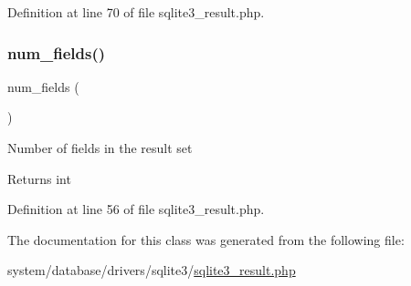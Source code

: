 Definition at line 70 of file sqlite3\+\_\+result.\+php.

\mbox{\label{class_c_i___d_b__sqlite3__result_af831bf363e4d7d661a717a4932af449d}} 
\subsubsection{\texorpdfstring{num\_fields()}{num\_fields()}}
{\footnotesize\ttfamily num\+\_\+fields (\begin{DoxyParamCaption}{ }\end{DoxyParamCaption})}

Number of fields in the result set

\begin{DoxyReturn}{Returns}
int 
\end{DoxyReturn}


Definition at line 56 of file sqlite3\+\_\+result.\+php.



The documentation for this class was generated from the following file\+:\begin{DoxyCompactItemize}
\item 
system/database/drivers/sqlite3/\mbox{\hyperlink{sqlite3__result_8php}{sqlite3\+\_\+result.\+php}}\end{DoxyCompactItemize}
